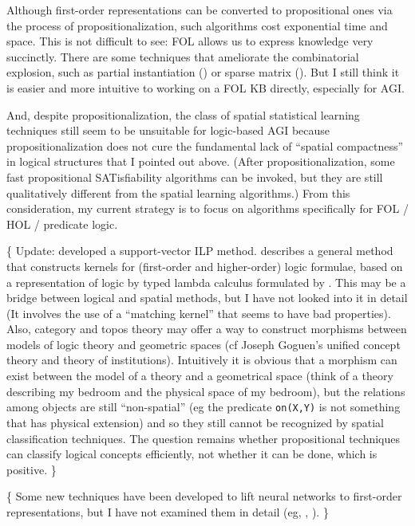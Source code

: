 Although first-order representations can be converted to propositional ones via the process of propositionalization, such algorithms cost exponential time and space.  This is not difficult to see:  FOL allows us to express knowledge very succinctly.  There are some techniques that ameliorate the combinatorial explosion, such as partial instantiation (\citep*{Chandru1999}) or sparse matrix (\citep*{Domingos2008}).  But I still think it is easier and more intuitive to working on a FOL KB directly, especially for AGI.

And, despite propositionalization, the class of spatial statistical learning techniques still seem to be unsuitable for logic-based AGI because propositionalization does not cure the fundamental lack of ``spatial compactness'' in logical structures that I pointed out above.  (After propositionalization, some fast propositional SATisfiability algorithms can be invoked, but they are still qualitatively different from the spatial learning algorithms.)  From this consideration, my current strategy is to focus on algorithms specifically for FOL / HOL / predicate logic.

\{ Update:  \citep*{Muggleton2005} developed a support-vector ILP method.  \citep*{Gartner2008} describes a general method that constructs kernels for (first-order and higher-order) logic formulae, based on a representation of logic by typed lambda calculus formulated by \citep*{Lloyd2003}.  This may be a bridge between logical and spatial methods, but I have not looked into it in detail (It involves the use of a ``matching kernel'' that seems to have bad properties).  Also, category and topos theory may offer a way to construct morphisms between models of logic theory and geometric spaces (cf Joseph Goguen's unified concept theory and theory of institutions).  Intuitively it is obvious that a morphism can exist between the model of a theory and a geometrical space (think of a theory describing my bedroom and the physical space of my bedroom), but the relations among objects are still ``non-spatial'' (eg the predicate \texttt{on(X,Y)} is not something that has physical extension) and so they still cannot be recognized by spatial classification techniques. The question remains whether propositional techniques can classify logical concepts efficiently, not whether it can be done, which is positive. \}

\{ Some new techniques have been developed to lift neural networks to first-order representations, but I have not examined them in detail (eg, \citep*{Garcez2009}, \citep*{Hammer2007}).  \}

